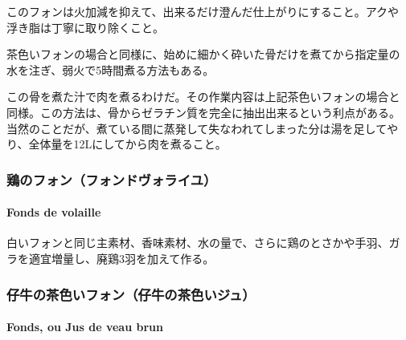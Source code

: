 \begin{recette}
このフォンは火加減を抑えて、出来るだけ澄んだ仕上がりにすること。アクや
浮き脂は丁寧に取り除くこと。

茶色いフォンの場合と同様に、始めに細かく砕いた骨だけを煮てから指定量の
水を注ぎ、弱火で5時間煮る方法もある。

この骨を煮た汁で肉を煮るわけだ。その作業内容は上記茶色いフォンの場合と
同様。この方法は、骨からゼラチン質を完全に抽出出来るという利点がある。
当然のことだが、煮ている間に蒸発して失なわれてしまった分は湯を足してや
り、全体量を12Lにしてから肉を煮ること。

\maeaki

\hypertarget{fondsdevolaille}{%
\subsubsection{鶏のフォン（フォンドヴォライユ）}\label{fondsdevolaille}}

\hypertarget{fonds-de-volaille}{%
\paragraph{Fonds de volaille}\label{fonds-de-volaille}}


白いフォンと同じ主素材、香味素材、水の量で、さらに鶏のとさかや手羽、ガ
ラを適宜増量し、廃鶏3羽を加えて作る。

\maeaki

\hypertarget{fondsdeveau}{%
\subsubsection{仔牛の茶色いフォン（仔牛の茶色いジュ）}\label{fondsdeveau}}

\hypertarget{jus-de-veau-brun}{%
\paragraph{Fonds, ou Jus de veau brun}\label{jus-de-veau-brun}}



\end{recette}
